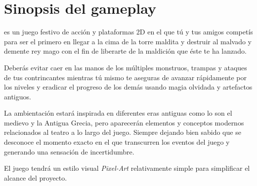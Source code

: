 \section{Sinopsis del gameplay}%



\emph{\izenburua } es un juego festivo de acción y plataformas 2D en el que tú y
tus amigos competís para ser el primero en llegar a la cima de la torre maldita
y destruir al malvado y demente rey mago con el fin de liberarte de la maldición
que éste te ha lanzado.




Deberás evitar caer en las manos de los múltiples monstruos, trampas y ataques
de tus contrincantes mientras tú mismo te aseguras de avanzar rápidamente por
los niveles y eradicar el progreso de los demás usando magia olvidada y
artefactos antiguos.


La ambientación estará inspirada en diferentes eras antiguas como lo son el
medievo y la Antigua Grecia, pero aparecerán elementos y conceptos modernos
relacionados al teatro a lo largo del juego. Siempre dejando bien sabido que se
desconoce el momento exacto en el que transcurren los eventos del juego y
generando una sensación de incertidumbre.


El juego tendrá un estilo visual \emph{Pixel-Art} relativamente simple para
simplificar el alcance del proyecto.